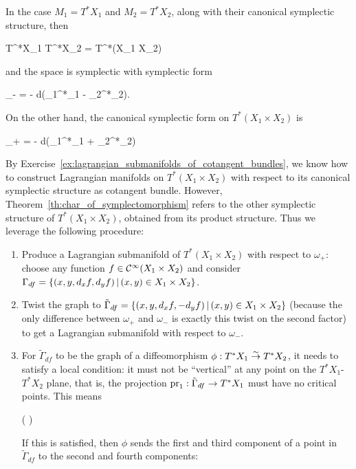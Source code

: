 \documentclass[main.tex]{subfiles}
\begin{document}
\begin{construction}
	In the case $M_1 = T^*X_1$ and $M_2 = T^*X_2$, along with their canonical symplectic structure, then
	\begin{eqalign}
		T^*X_1 \times T^*X_2 = T^*(X_1 \times X_2)
	\end{eqalign}
	and the space is symplectic with symplectic form
	\begin{eqalign}
		\omega_- = - d(\pr_1^*\alpha_1 - \pr_2^*\alpha_2).
	\end{eqalign}
	On the other hand, the canonical symplectic form on $T^*(X_1 \times X_2)$ is
	\begin{eqalign}
		\omega_+ = - d(\pr_1^*\alpha_1 + \pr_2^*\alpha_2)
	\end{eqalign}
	By Exercise~\ref{ex:lagrangian_submanifolds_of_cotangent_bundles}, we know how to construct Lagrangian manifolds on $T^*(X_1 \times X_2)$ with respect to its canonical symplectic structure as cotangent bundle. However, Theorem~\ref{th:char_of_symplectomorphism} refers to the other symplectic structure of $T^*(X_1 \times X_2)$, obtained from its product structure. Thus we leverage the following procedure:
	\begin{enumerate}
		\item Produce a Lagrangian submanifold of $T^*(X_1 \times X_2)$ with respect to $\omega_+$: choose any function $f \in \mathcal{C}^\infty(X_1 \times X_2)$ and consider $\Gamma_{df} = \{(x,y,d_x f, d_y f) \,|\, (x,y) \in X_1 \times X_2\}$.
		\item Twist the graph to $\tilde\Gamma_{df} = \{(x,y,d_xf,-d_yf) \,|\, (x,y) \in X_1 \times X_2\}$ (because the only difference between $\omega_+$ and $\omega_-$ is exactly this twist on the second factor) to get a Lagrangian submanifold with respect to $\omega_-$.
		\item For $\tilde\Gamma_{df}$ to be the graph of a diffeomorphism $\phi : T^*X_1 \overset{\sim}\to T^*X_2$, it needs to satisfy a local condition: it must not be ``vertical'' at any point on the $T^*X_1$-$T^*X_2$ plane, that is, the projection $\mathrm{pr}_1 : \tilde\Gamma_{df} \to T^*X_1$ must have no critical points. This means
		\begin{eqalign}
		\label{eq:canonical_transf_from_gen_funcs_invertibility}
			\det \left(  \right) \neq 0
		\end{eqalign}
		If this is satisfied, then $\phi$ sends the first and third component of a point in $\tilde\Gamma_{df}$ to the second and fourth components:
		\begin{eqalign}

\end{eqalign}
\end{enumerate}
\end{construction}
\end{document}
